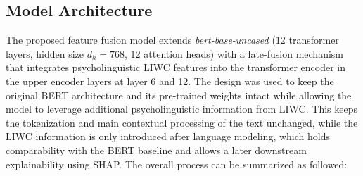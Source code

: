 \subsection{Model Architecture}

The proposed feature fusion model extends \textit{bert-base-uncased} (12 transformer layers, hidden size \(d_h=768\), 12 attention heads) with a late-fusion mechanism that integrates psycholinguistic LIWC features into the transformer encoder in the upper encoder layers at layer 6 and 12. The design was used to keep the original BERT architecture and its pre-trained weights intact while allowing the model to leverage additional psycholinguistic information from LIWC. This keeps the tokenization and main contextual processing of the text unchanged, while the LIWC information is only introduced after language modeling, which holds comparability with the BERT baseline and allows a later downstream explainability using SHAP. The overall process can be summarized as followed:

